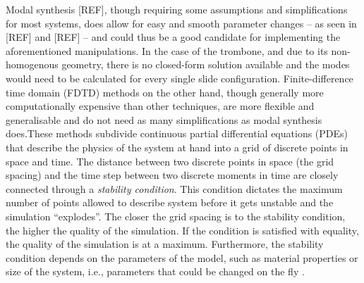 Modal synthesis [REF], though requiring some assumptions and simplifications for most systems, does allow for easy and smooth parameter changes -- as seen in [REF] and [REF] -- and could thus be a good candidate for implementing the aforementioned manipulations. In the case of the trombone, and due to its non-homogenous geometry, there is no closed-form solution available and the modes would need to be calculated for every single slide configuration. Finite-difference time domain (FDTD) methods on the other hand, though generally more computationally expensive than other techniques, are more flexible and generalisable and do not need as many simplifications as modal synthesis does. These methods subdivide continuous partial differential equations (PDEs) that describe the physics of the system at hand into a grid of discrete points in space and time. 
%
%
The distance between two discrete points in space (the grid spacing) and the time step between two discrete moments in time are closely connected through a \textit{stability condition}. This condition dictates the maximum number of points allowed to describe system before it gets unstable and the simulation ``explodes''. The closer the grid spacing is to the stability condition, the higher the quality of the simulation. If the condition is satisfied with equality, the quality of the simulation is at a maximum.  
Furthermore, the stability condition depends on the parameters of the model, such as material properties or size of the system, i.e., parameters that could be changed on the fly \SBcomment[As above].

